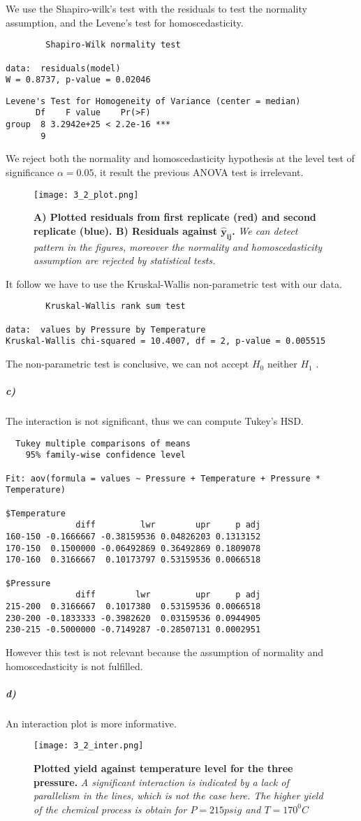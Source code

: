 \documentclass{article}
\begin{document}
We use the Shapiro-wilk's test with the residuals to test the normality assumption, and the Levene's test for homoscedasticity.
\begin{verbatim}
        Shapiro-Wilk normality test

data:  residuals(model) 
W = 0.8737, p-value = 0.02046
\end{verbatim}
\begin{verbatim}
Levene's Test for Homogeneity of Variance (center = median)
      Df    F value    Pr(>F)    
group  8 3.2942e+25 < 2.2e-16 ***
       9                         
\end{verbatim}
We reject both the normality and homoscedasticity hypothesis at the level test of significance $\alpha=0.05$, it result the previous ANOVA test is irrelevant.
\begin{figure}[H]
	  \centering
  	\texttt{[image: 3\_2\_plot.png]}
  	\caption{\textbf{A) Plotted residuals from first replicate (red) and second replicate (blue). B) Residuals against $\pmb{\widehat{y}_{ij}}$.} \textsl{We can detect pattern in the figures, moreover the normality and homoscedasticity assumption are rejected by statistical tests.}}
	\end{figure}
It follow we have to use the Kruskal-Wallis non-parametric test with our data.
\begin{verbatim}
        Kruskal-Wallis rank sum test

data:  values by Pressure by Temperature 
Kruskal-Wallis chi-squared = 10.4007, df = 2, p-value = 0.005515
\end{verbatim}
The non-parametric test is conclusive, we can not accept $H_0$ neither $H_1$ .
\subparagraph{c)}

The interaction is not significant, thus we can compute Tukey's HSD.
\begin{verbatim}
  Tukey multiple comparisons of means
    95% family-wise confidence level

Fit: aov(formula = values ~ Pressure + Temperature + Pressure * Temperature)

$Temperature
              diff         lwr        upr     p adj
160-150 -0.1666667 -0.38159536 0.04826203 0.1313152
170-150  0.1500000 -0.06492869 0.36492869 0.1809078
170-160  0.3166667  0.10173797 0.53159536 0.0066518

$Pressure
              diff        lwr         upr     p adj
215-200  0.3166667  0.1017380  0.53159536 0.0066518
230-200 -0.1833333 -0.3982620  0.03159536 0.0944905
230-215 -0.5000000 -0.7149287 -0.28507131 0.0002951
\end{verbatim}
However this test is not relevant because the assumption of normality and homoscedasticity is not fulfilled. 
\subparagraph{d)}
An interaction plot is more informative.
\begin{figure}[H]
	  \centering
  	\texttt{[image: 3\_2\_inter.png]}
  	\caption{\textbf{Plotted yield against temperature level for the three pressure.} \textsl{A significant interaction is indicated by a lack of parallelism in the lines, which is not the case here. The higher yield of the chemical process is obtain for $P=215psig$ and $T=170^0C$}}
	\end{figure}
\newpage
\end{document}
